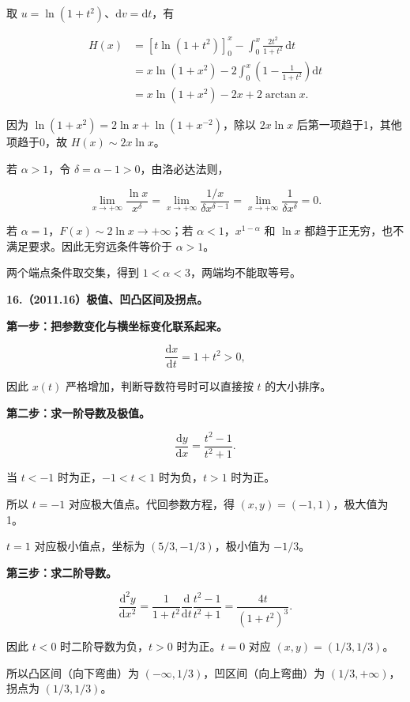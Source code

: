 \documentclass[UTF8,11pt,fontset=windows]{ctexart}
\begin{document}
取 $u=\ln(1+t^2)$、$\mathrm dv=\mathrm dt$，有

$$
\begin{aligned}
H(x)
&=[t\ln(1+t^2)]_0^x-\int_0^x\frac{2t^2}{1+t^2}\,\mathrm dt\\
&=x\ln(1+x^2)-2\int_0^x\left(1-\frac1{1+t^2}\right)\mathrm dt\\
&=x\ln(1+x^2)-2x+2\arctan x.
\end{aligned}
$$

因为 $\ln(1+x^2)=2\ln x+\ln(1+x^{-2})$，除以 $2x\ln x$ 后第一项趋于1，其他项趋于0，故 $H(x)\sim2x\ln x$。

若 $\alpha>1$，令 $\delta=\alpha-1>0$，由洛必达法则，

$$
\lim_{x\to+\infty}\frac{\ln x}{x^\delta}
=\lim_{x\to+\infty}\frac{1/x}{\delta x^{\delta-1}}
=\lim_{x\to+\infty}\frac1{\delta x^\delta}=0.
$$

若 $\alpha=1$，$F(x)\sim2\ln x\to+\infty$；若 $\alpha<1$，$x^{1-\alpha}$ 和 $\ln x$ 都趋于正无穷，也不满足要求。因此无穷远条件等价于 $\alpha>1$。

两个端点条件取交集，得到 $1<\alpha<3$，两端均不能取等号。

\clearpage

\textbf{16.（2011.16）极值、凹凸区间及拐点。}

\textbf{第一步：把参数变化与横坐标变化联系起来。}

$$
\frac{\mathrm dx}{\mathrm dt}=1+t^2>0,
$$

因此 $x(t)$ 严格增加，判断导数符号时可以直接按 $t$ 的大小排序。

\textbf{第二步：求一阶导数及极值。}

$$
\frac{\mathrm dy}{\mathrm dx}=\frac{t^2-1}{t^2+1}.
$$

当 $t<-1$ 时为正，$-1<t<1$ 时为负，$t>1$ 时为正。

所以 $t=-1$ 对应极大值点。代回参数方程，得 $(x,y)=(-1,1)$，极大值为1。

$t=1$ 对应极小值点，坐标为 $(5/3,-1/3)$，极小值为 $-1/3$。

\textbf{第三步：求二阶导数。}

$$
\frac{\mathrm d^2y}{\mathrm dx^2}
=\frac{1}{1+t^2}\frac{\mathrm d}{\mathrm dt}\frac{t^2-1}{t^2+1}
=\frac{4t}{(1+t^2)^3}.
$$

因此 $t<0$ 时二阶导数为负，$t>0$ 时为正。$t=0$ 对应 $(x,y)=(1/3,1/3)$。

所以凸区间（向下弯曲）为 $(-\infty,1/3)$，凹区间（向上弯曲）为 $(1/3,+\infty)$，拐点为 $(1/3,1/3)$。
\end{document}

